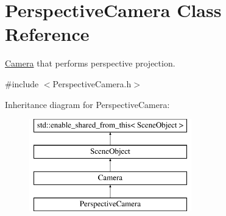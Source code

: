\hypertarget{class_perspective_camera}{}\section{Perspective\+Camera Class Reference}
\label{class_perspective_camera}


\hyperlink{class_camera}{Camera} that performs perspective projection.  




{\ttfamily \#include $<$Perspective\+Camera.\+h$>$}

Inheritance diagram for Perspective\+Camera\+:\begin{figure}[H]
\begin{center}
\leavevmode
\includegraphics[height=4.000000cm]{class_perspective_camera}
\end{center}
\end{figure}
